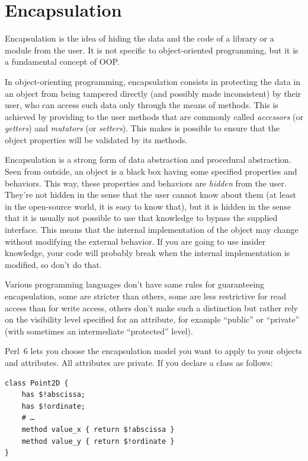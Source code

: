 \section{Encapsulation}

Encapsulation is the idea of hiding the data and the code 
of a library or a module from the user. It is not specific to 
object-oriented programming, but it is a fundamental concept 
of OOP.

In object-orienting programming, encapsulation consists in 
protecting the data in an object from being tampered 
directly (and possibly made inconsistent) 
by their user, who can access such data only through
the means of methods. This is achieved by providing to the 
user methods that are commonly called \emph{accessors} (or 
\emph{getters}) and \emph{mutators} (or \emph{setters}). This 
makes is possible to ensure that the object properties will 
be validated by its methods.

Encapsulation is a strong form of data abstraction and 
procedural abstraction. Seen from outside, an object 
is a black box having some specified properties and 
behaviors. This way, these properties and behaviors are 
\emph{hidden} from the user. They're not hidden in the 
sense that the user cannot know about them (at least in 
the open-source world, it is easy to know that), but it 
is hidden in the sense that it is usually not possible to 
use that knowledge to bypass the supplied interface. This 
means that the internal implementation of the object may 
change without modifying the external behavior. If you 
are going to use insider knowledge, your code will 
probably break when the internal implementation is 
modified, so don't do that.

Various programming languages don't have same rules for 
guaranteeing encapsulation, some are stricter than others, 
some are less restrictive for read access than for write access, 
others don't make such a distinction but rather rely on the 
visibility level specified for an attribute, for example 
``public'' or ``private'' (with sometimes an intermediate 
``protected'' level).

Perl~6 lets you choose the encapsulation model you want to 
apply to your objects and attributes. All attributes are 
private. If you declare a class as follows:

\begin{verbatim}
class Point2D {
    has $!abscissa;
    has $!ordinate;
    # …
    method value_x { return $!abscissa }
    method value_y { return $!ordinate }
}
\end{verbatim}

